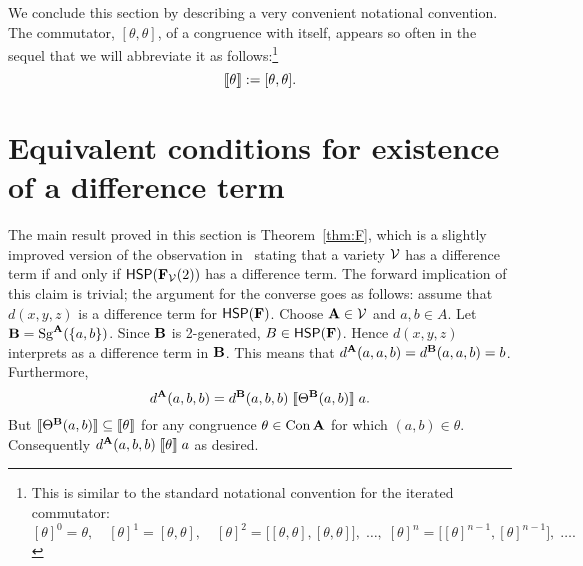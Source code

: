 We conclude this section by describing a very convenient notational convention.
The commutator, $[\theta, \theta]$, of a congruence with
itself, appears so often in the sequel that we will abbreviate it as
follows:\footnote{This is similar to the standard notational convention
  for the iterated commutator:
  \[
    [\theta]^0 =  \theta, \quad
    [\theta]^1 =  [\theta, \theta],  \quad
    [\theta]^2 =  \bigl[[\theta, \theta],[\theta, \theta]\bigr],  \; \dots, \;
    [\theta]^n =  \bigl[[\theta]^{n-1}, [\theta]^{n-1}\bigr], \; \dots.
    \]
}
\[
\llbracket \theta\rrbracket:= [\theta, \theta].
\]



\section{Equivalent conditions for existence of a difference term}
\label{sec:equiv-cond-exist}
The main result proved in this section is Theorem~\ref{thm:F}, which 
is a slightly improved version of the observation
in~\cite{MR1358491}
stating that a variety $\mathcal{V}$ has a difference term if and only if
$\mathsf{H} \mathsf{S} \mathsf{P}(\mathbf{F}_{\mathcal{V}}(2))$ 
has a difference term.
The forward implication of this claim is trivial;
the argument for the converse goes as follows:
assume that $d(x, y, z)$ is a difference term for $\mathsf{H} \mathsf{S} \mathsf{P}(\mathbf{F})$.
Choose $\mathbf{A} \in \mathcal{V}$ and $a, b \in A$. Let $\mathbf{B} = \operatorname{Sg}^{\mathbf{A}} (\{a, b\})$.
Since $\mathbf{B}$ is 2-generated, $B \in \mathsf{H} \mathsf{S} \mathsf{P} (\mathbf{F})$.
Hence $d(x, y, z)$ interprets as a difference term in $\mathbf{B}$. This means that
$d^{\mathbf{A}} (a, a, b) = d^{\mathbf{B}} (a, a, b) = b$.
Furthermore,
\[
d^{\mathbf{A}} (a, b, b) = d^{\mathbf{B}} (a, b, b)
\mathrel{\llbracket \Theta^{\mathbf{B}} (a, b) \rrbracket}
a.
\]
But
$\llbracket \Theta^{\mathbf{B}} (a, b) \rrbracket \subseteq \llbracket \theta \rrbracket$
for any congruence
$\theta \in \operatorname{Con} \mathbf{A}$ for which $(a, b) \in \theta$. Consequently
$d^{\mathbf{A}} (a, b, b)
\mathrel{\llbracket \theta \rrbracket}
a$ as desired.

